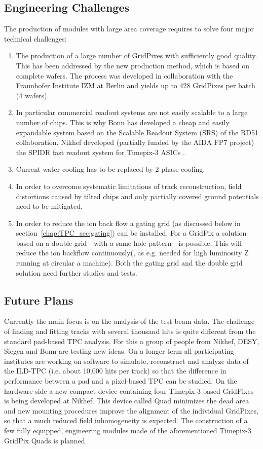 \subsection{Engineering Challenges}
The production of modules with large area coverage requires to solve four
major technical challenges: 
\begin{enumerate}
  \item The production of a large number of GridPixes with sufficiently good
quality. This has been addressed by the new production method, which is based
on complete wafers. The process was developed in collaboration with the
Fraunhofer Institute IZM at Berlin and yields up to 428 GridPixes per batch (4 wafers). 
\item In particular commercial readout systems are not easily scalable to a large number of chips. This is why Bonn has developed a cheap and easily expandable system based on the Scalable Readout System (SRS) of the RD51 collaboration.
Nikhef developed (partially funded by the AIDA FP7 project) the SPIDR fast readout system for Timepix-3 ASICs \cite{1748-0221-10-12-C12028}.
\item Current water cooling has to be replaced by 2-phase  cooling.
\item In order to overcome systematic limitations of track reconstruction, field
  distortions caused by tilted chips and only partially covered ground
  potentials need to be mitigated.
\item In order to reduce the ion back flow a gating grid (as discussed below in section~\ref{chap:TPC_sec:gating}) can
be installed. For a GridPix a solution based on a double grid - with a same hole pattern - is possible.
This will reduce the ion backflow continuously(, as e.g. needed for high luminosity Z running
at circular a machine). Both the gating grid and the double grid solution need further
studies and tests.

\end{enumerate}

\subsection{Future Plans}
Currently the main focus is on the analysis of the test beam data. The
challenge of finding and fitting tracks with several thousand hits is quite
different from the standard pad-based TPC analysis. For this a group of people
from Nikhef, DESY, Siegen and Bonn are testing new ideas. On a longer term all
participating institutes are working on software to simulate, reconstruct and
analyze data of the ILD-TPC (i.e. about 10,000 hits per track) so that the
difference in performance between a pad and a pixel-based TPC can be studied. 
On the hardware side a new compact device containing four Timepix-3-based
GridPixes is being developed at Nikhef. This device called Quad minimizes the
dead area and new mounting procedures improve the alignment of the individual GridPixes,
so that a much reduced field inhomogeneity is expected. The construction of a
few fully equipped, engineering modules made of the aforementioned Timepix-3
GridPix Quads is planned.

